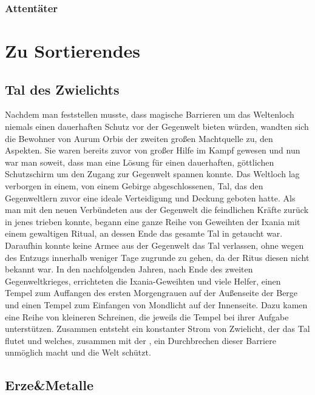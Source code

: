 \documentclass[a4paper,12pt,oneside]{book}
\begin{document}
\section{Attentäter}
\newpage

\part{Zu Sortierendes}

\chapter{Tal des Zwielichts}\label{Tal des Zwielicht}
Nachdem man feststellen musste, dass magische Barrieren um das Weltenloch niemals einen dauerhaften Schutz vor der Gegenwelt bieten würden, wandten sich die Bewohner von Aurum Orbis der zweiten großen Machtquelle zu, den Aspekten. Sie waren bereits zuvor von großer Hilfe im Kampf gewesen und nun war man soweit, dass man eine Lösung für einen dauerhaften, göttlichen Schutzschirm um den Zugang zur Gegenwelt spannen konnte. Das Weltloch lag verborgen in einem, von einem Gebirge abgeschlossenen, Tal, das den Gegenweltlern zuvor eine ideale Verteidigung und Deckung geboten hatte. Als man mit den neuen Verbündeten aus der Gegenwelt die feindlichen Kräfte zurück in jenes trieben konnte, begann eine ganze Reihe von Geweihten der Ixania mit einem gewaltigen Ritual, an dessen Ende das gesamte Tal in \uline{} getaucht war. Daraufhin konnte keine Armee aus der Gegenwelt das Tal verlassen, ohne wegen des Entzugs innerhalb weniger Tage zugrunde zu gehen, da der Ritus diesen nicht bekannt war. In den nachfolgenden Jahren, nach Ende des zweiten Gegenweltkrieges, errichteten die Ixania-Geweihten und viele Helfer, einen Tempel zum Auffangen des ersten Morgengrauen auf der Außenseite der Berge und einen Tempel zum Einfangen von Mondlicht auf der Innenseite. Dazu kamen eine Reihe von kleineren Schreinen, die jeweils die Tempel bei ihrer Aufgabe unterstützen. Zusammen entsteht ein konstanter Strom von Zwielicht, der das Tal flutet und welches, zusammen mit der \uline{}, ein Durchbrechen dieser Barriere unmöglich macht und die Welt schützt.


\chapter{Erze\&Metalle}
\end{document}
